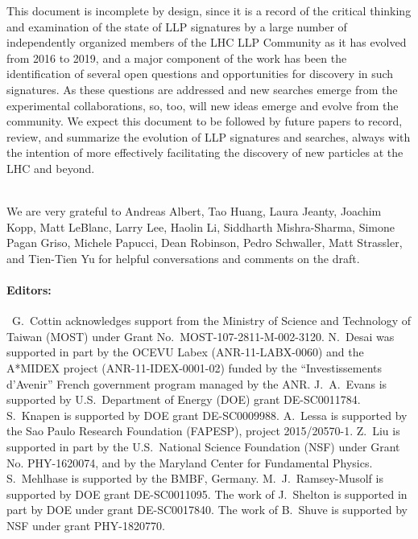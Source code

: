 This document is incomplete by design, since it is a record of the critical thinking and examination of the state of LLP signatures by a large number of independently organized members of the LHC LLP Community as it has evolved from 2016 to 2019, and a major component of the work has been the identification of several open questions and opportunities for discovery in such signatures.
As these questions are addressed and new searches emerge from the experimental collaborations, so, too, will new ideas emerge and evolve from the community.
We expect this document to be followed by future papers to record, review, and summarize the evolution of LLP signatures and searches, always with the intention of more effectively facilitating the discovery of new particles at the LHC and beyond. \\

\vspace{\baselineskip}

\\

We are very grateful to Andreas Albert, Tao Huang, Laura Jeanty, Joachim Kopp, Matt LeBlanc, Larry Lee, Haolin Li, Siddharth Mishra-Sharma, Simone Pagan Griso, Michele Papucci, Dean Robinson, Pedro Schwaller, Matt Strassler, and Tien-Tien Yu for helpful conversations and comments on the draft.\\

\paragraph{Editors:}~G.~Cottin acknowledges support from the Ministry of Science and Technology of Taiwan (MOST) under Grant No.~MOST-107-2811-M-002-3120. N.~Desai was supported in part by the OCEVU Labex (ANR-11-LABX-0060) and the A*MIDEX project (ANR-11-IDEX-0001-02) funded by the ``Investissements d'Avenir'' French government program managed by the ANR. J.~A.~Evans is supported by U.S.~Department of Energy (DOE) grant DE-SC0011784. S.~Knapen is supported by DOE grant DE-SC0009988. A.~Lessa is supported by the Sao Paulo Research Foundation (FAPESP), project 2015/20570-1. Z.~Liu is supported in part by the U.S.~National Science Foundation (NSF) under Grant No. PHY-1620074, and by the Maryland Center for Fundamental Physics. S.~Mehlhase is supported by the BMBF, Germany. M.~J.~Ramsey-Musolf is supported by DOE grant DE-SC0011095. The work of J.~Shelton is supported in part by DOE under grant DE-SC0017840. The work of B.~Shuve is supported by NSF under grant PHY-1820770.\\

